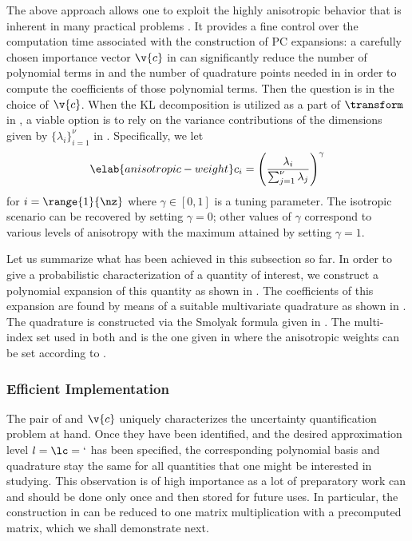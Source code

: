 The above approach allows one to exploit the highly anisotropic behavior that is
inherent in many practical problems \cite{nobile2008}. It provides a fine
control over the computation time associated with the construction of \ac{PC}
expansions: a carefully chosen importance vector $\v{c}$ in
 can significantly reduce the number of
polynomial terms in  and the number of quadrature points
needed in  in order to compute the coefficients of those
polynomial terms. Then the question is in the choice of $\v{c}$. When the
\ac{KL} decomposition is utilized as a part of $\transform$ in
, a viable option is to rely on the variance contributions
of the dimensions given by $\{ \lambda_i \}_{i = 1}^\nu$ in
. Specifically, we let
\begin{equation} \elab{anisotropic-weight}
  c_i = \left(\frac{\lambda_i}{\sum_{j = 1}^\nu \lambda_j}\right)^\gamma
\end{equation}
for $i = \range{1}{\nz}$ where $\gamma \in [0, 1]$ is a tuning parameter. The
isotropic scenario can be recovered by setting $\gamma = 0$; other values of
$\gamma$ correspond to various levels of anisotropy with the maximum attained by
setting $\gamma = 1$.

Let us summarize what has been achieved in this subsection so far. In order to
give a probabilistic characterization of a quantity of interest, we construct a
polynomial expansion of this quantity as shown in . The
coefficients of this expansion are found by means of a suitable multivariate
quadrature as shown in . The quadrature is constructed
via the Smolyak formula given in . The multi-index set
used in both  and  is the one
given in  where the anisotropic weights can
be set according to .

\subsubsection{Efficient Implementation}

The pair of \vz and $\v{c}$ uniquely characterizes the uncertainty
quantification problem at hand. Once they have been identified, and the desired
approximation level $l = \lc = \lq$ has been specified, the corresponding
polynomial basis and quadrature stay the same for all quantities that one might
be interested in studying. This observation is of high importance as a lot of
preparatory work can and should be done only once and then stored for future
uses. In particular, the construction in  can be
reduced to one matrix multiplication with a precomputed matrix, which we shall
demonstrate next.

